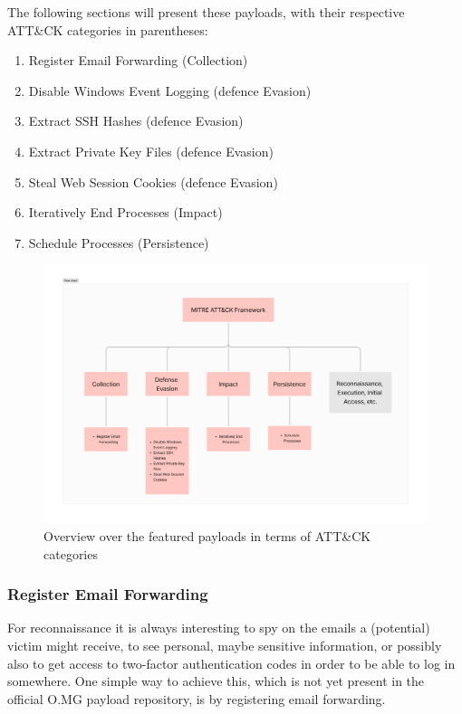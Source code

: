 The following sections will present these payloads, with their respective ATT\&CK categories in parentheses:
\begin{enumerate}
    \item Register Email Forwarding (Collection)
    \item Disable Windows Event Logging (defence Evasion)
    \item Extract SSH Hashes (defence Evasion)
    \item Extract Private Key Files (defence Evasion)
    \item Steal Web Session Cookies (defence Evasion)
    \item Iteratively End Processes (Impact)
    \item Schedule Processes (Persistence)
\end{enumerate}


\begin{figure}[H]
    \centering
    \includegraphics[width=1\linewidth]{visuals/payloads_overview.png}
    \caption{Overview over the featured payloads in terms of ATT\&CK categories}
\end{figure}





\subsubsection{Register Email Forwarding}

For reconnaissance it is always interesting to spy on the emails a (potential) victim might receive, to see personal, maybe sensitive information, or possibly also to get access to two-factor authentication codes in order to be able to log in somewhere. One simple way to achieve this, which is not yet present in the official O.MG payload repository, is by registering email forwarding. 



